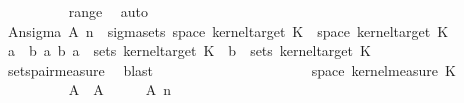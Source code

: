 \begin{isabellebody}
\ \ \ \ \ \ \ \ \isamarkupfalse%
\ range\ \isamarkupfalse%
\ auto\isanewline
\ \ \ \ \ \ \isamarkupfalse%
\ \isamarkupfalse%
\ A{\isacharunderscore}{\kern0pt}n{\isacharunderscore}{\kern0pt}sigma{\isacharcolon}{\kern0pt}\ {\isachardoublequoteopen}A\ n\ {\isasymin}\ sigma{\isacharunderscore}{\kern0pt}sets\ {\isacharparenleft}{\kern0pt}space\ {\isacharparenleft}{\kern0pt}kernel{\isacharunderscore}{\kern0pt}target\ K{\isacharunderscore}{\kern0pt}{}{\isacharparenright}{\kern0pt}\ {\isasymtimes}\ space\ {\isacharparenleft}{\kern0pt}kernel{\isacharunderscore}{\kern0pt}target\ K{\isacharunderscore}{\kern0pt}{}{\isacharparenright}{\kern0pt}{\isacharparenright}{\kern0pt}\isanewline
\ {\isacharbraceleft}{\kern0pt}a\ {\isasymtimes}\ b\ {\isacharbar}{\kern0pt}a\ b{\isachardot}{\kern0pt}\ a\ {\isasymin}\ sets\ {\isacharparenleft}{\kern0pt}kernel{\isacharunderscore}{\kern0pt}target\ K{\isacharunderscore}{\kern0pt}{}{\isacharparenright}{\kern0pt}\ {\isasymand}\ b\ {\isasymin}\ sets\ {\isacharparenleft}{\kern0pt}kernel{\isacharunderscore}{\kern0pt}target\ K{\isacharunderscore}{\kern0pt}{}{\isacharparenright}{\kern0pt}{\isacharbraceright}{\kern0pt}{\isachardoublequoteclose}\isanewline
\ \ \ \ \ \ \ \ \isamarkupfalse%
\ sets{\isacharunderscore}{\kern0pt}pair{\isacharunderscore}{\kern0pt}measure\ \isamarkupfalse%
\ blast\isanewline
\ \ \ \ \ \ \isacommand{{\isacharbraceleft}{\kern0pt}}\isamarkupfalse%
\isanewline
\ \ \ \ \ \ \ \ \isamarkupfalse%
\ {\isasymomega}\ \isamarkupfalse%
\ {\isasymomega}\ {\isachardoublequoteopen}{\isasymomega}\ {\isasymin}\ space\ {\isacharparenleft}{\kern0pt}kernel{\isacharunderscore}{\kern0pt}measure\ K{\isacharunderscore}{\kern0pt}{}\ {\isasymomega}\isanewline
\ \ \ \ \ \ \ \ \isamarkupfalse%
\ A{\isacharprime}{\kern0pt}\ \ {\isachardoublequoteopen}A{\isacharprime}{\kern0pt}\ {\isacharequal}{\kern0pt}\ {\isacharbraceleft}{\kern0pt}{\isasymomega}\ {\isacharparenleft}{\kern0pt}{\isasymomega}\ {\isasymomega}\ {\isasymin}\ A\ n{\isacharbraceright}{\kern0pt}{\isachardoublequoteclose}\isanewline

\end{isabellebody}
